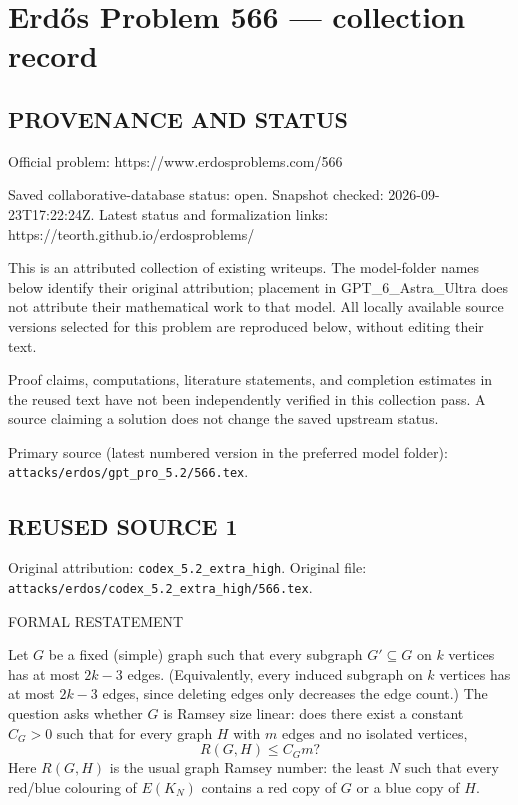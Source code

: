 \section*{Erd\H{o}s Problem 566 --- collection record}

\subsection*{PROVENANCE AND STATUS}
Official problem: https://www.erdosproblems.com/566

Saved collaborative-database status: open.
Snapshot checked: 2026-09-23T17:22:24Z.
Latest status and formalization links: https://teorth.github.io/erdosproblems/

This is an attributed collection of existing writeups. The model-folder names below identify their original attribution; placement in GPT\_6\_Astra\_Ultra does not attribute their mathematical work to that model. All locally available source versions selected for this problem are reproduced below, without editing their text.

Proof claims, computations, literature statements, and completion estimates in the reused text have not been independently verified in this collection pass. A source claiming a solution does not change the saved upstream status.

Primary source (latest numbered version in the preferred model folder): \texttt{attacks/erdos/gpt\_pro\_5.2/566.tex}.

\subsection*{REUSED SOURCE 1}
Original attribution: \texttt{codex\_5.2\_extra\_high}.
Original file: \texttt{attacks/erdos/codex\_5.2\_extra\_high/566.tex}.

FORMAL RESTATEMENT

Let $G$ be a fixed (simple) graph such that every subgraph $G'\subseteq G$ on $k$ vertices has at most $2k-3$ edges.
(Equivalently, every induced subgraph on $k$ vertices has at most $2k-3$ edges, since deleting edges only decreases the edge count.)
The question asks whether $G$ is Ramsey size linear:
does there exist a constant $C_G>0$ such that for every graph $H$ with $m$ edges and no isolated vertices,
\[
R(G,H) \le C_G m ?
\]
Here $R(G,H)$ is the usual graph Ramsey number: the least $N$ such that every red/blue colouring of $E(K_N)$ contains a red copy of $G$ or a blue copy of $H$.

